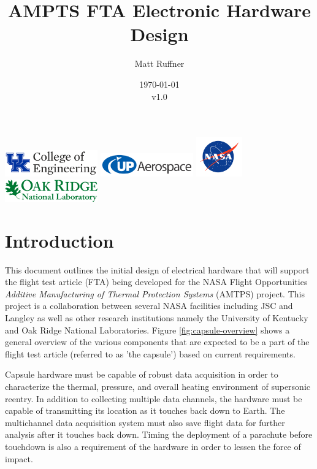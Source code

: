 \documentclass{article}
\title{AMPTS FTA Electronic Hardware Design}
\author{Matt Ruffner}
\date{\today\\v1.0}
\begin{document}
\maketitle
\begin{center}
	\includegraphics[width=4cm]{images/ukcoe.png}
	\includegraphics[width=4cm]{images/upaero-logo.png}
	\includegraphics[width=2cm]{images/nasa-logo.png}
	\includegraphics[width=4cm]{images/ornl.pdf}	
\end{center}
\tableofcontents \newpage
\listoffigures 
\listoftables \newpage



\section{Introduction}
This document outlines the initial design of electrical hardware that will support the flight test article (FTA) being developed for the NASA Flight Opportunities \textit{Additive Manufacturing of Thermal Protection Systems} (AMTPS) project. This project is a collaboration between several NASA facilities including JSC and Langley as well as other research institutions namely the University of Kentucky and Oak Ridge National Laboratories. Figure \ref{fig:capsule-overview} shows a general overview of the various components that are  expected to be a part of the flight test article (referred to as 'the capsule') based on current requirements.

Capsule hardware must be capable of robust data acquisition in order to characterize the thermal, pressure, and overall heating environment of supersonic reentry. In addition to collecting multiple data channels, the hardware must be capable of transmitting its location as it touches back down to Earth. The multichannel data acquisition system must also save flight data for further analysis after it touches back down. Timing the deployment of a parachute before touchdown is also a requirement of the hardware in order to lessen the force of impact.
\end{document}
